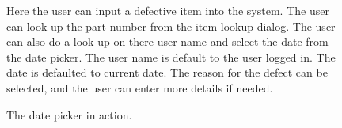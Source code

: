 \documentclass[12pt]{report}
\begin{document}
\begin{figure}[h!]
\caption{Here the user can input a defective item into the system.  The
user can look up the part number from the item lookup dialog.  The user
can also do a look up on there user name and select the date from the 
date picker.  The user name is default to the user logged in.  The date is
defaulted to current date.  The reason for the defect can be selected, 
and the user can enter more details if needed.}
\end{figure}

\begin{figure}[h!]
\caption{The date picker in action.}
\end{figure}
\end{document}
